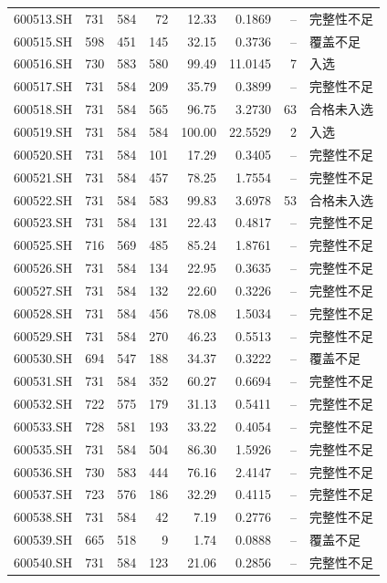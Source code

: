 \documentclass[10pt,a4paper]{article}
\begin{document}
\begin{longtable}{lrrr r r r l}
600513.SH & 731 & 584 & 72 & 12.33 & 0.1869 & -- & 完整性不足\\
600515.SH & 598 & 451 & 145 & 32.15 & 0.3736 & -- & 覆盖不足\\
600516.SH & 730 & 583 & 580 & 99.49 & 11.0145 & 7 & 入选\\
600517.SH & 731 & 584 & 209 & 35.79 & 0.3899 & -- & 完整性不足\\
600518.SH & 731 & 584 & 565 & 96.75 & 3.2730 & 63 & 合格未入选\\
600519.SH & 731 & 584 & 584 & 100.00 & 22.5529 & 2 & 入选\\
600520.SH & 731 & 584 & 101 & 17.29 & 0.3405 & -- & 完整性不足\\
600521.SH & 731 & 584 & 457 & 78.25 & 1.7554 & -- & 完整性不足\\
600522.SH & 731 & 584 & 583 & 99.83 & 3.6978 & 53 & 合格未入选\\
600523.SH & 731 & 584 & 131 & 22.43 & 0.4817 & -- & 完整性不足\\
600525.SH & 716 & 569 & 485 & 85.24 & 1.8761 & -- & 完整性不足\\
600526.SH & 731 & 584 & 134 & 22.95 & 0.3635 & -- & 完整性不足\\
600527.SH & 731 & 584 & 132 & 22.60 & 0.3226 & -- & 完整性不足\\
600528.SH & 731 & 584 & 456 & 78.08 & 1.5034 & -- & 完整性不足\\
600529.SH & 731 & 584 & 270 & 46.23 & 0.5513 & -- & 完整性不足\\
600530.SH & 694 & 547 & 188 & 34.37 & 0.3222 & -- & 覆盖不足\\
600531.SH & 731 & 584 & 352 & 60.27 & 0.6694 & -- & 完整性不足\\
600532.SH & 722 & 575 & 179 & 31.13 & 0.5411 & -- & 完整性不足\\
600533.SH & 728 & 581 & 193 & 33.22 & 0.4054 & -- & 完整性不足\\
600535.SH & 731 & 584 & 504 & 86.30 & 1.5926 & -- & 完整性不足\\
600536.SH & 730 & 583 & 444 & 76.16 & 2.4147 & -- & 完整性不足\\
600537.SH & 723 & 576 & 186 & 32.29 & 0.4115 & -- & 完整性不足\\
600538.SH & 731 & 584 & 42 & 7.19 & 0.2776 & -- & 完整性不足\\
600539.SH & 665 & 518 & 9 & 1.74 & 0.0888 & -- & 覆盖不足\\
600540.SH & 731 & 584 & 123 & 21.06 & 0.2856 & -- & 完整性不足\\

\end{longtable}
\end{document}
